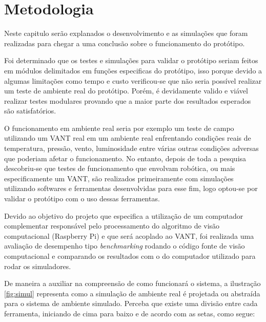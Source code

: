 \chapter{Metodologia}\label{cap:metodologia}

Neste capitulo serão explanados o desenvolvimento e as simulações que foram realizadas para chegar a uma conclusão sobre o funcionamento do protótipo.

Foi determinado que os testes e simulações para validar o protótipo seriam feitos em módulos delimitados em funções especificas do protótipo, isso porque devido a algumas limitações como tempo e custo verificou-se que não seria possível realizar um teste de ambiente real do protótipo. Porém, é devidamente valido e viável realizar testes modulares provando que a maior parte dos resultados esperados são satisfatórios. 

O funcionamento em ambiente real seria por exemplo um teste de campo utilizando um VANT real em um ambiente real enfrentando condições reais de temperatura, pressão, vento, luminosidade entre várias outras condições adversas que poderiam afetar o funcionamento. No entanto, depois de toda a pesquisa descobriu-se que testes de funcionamento que envolvam robótica, ou mais especificamente um VANT, são realizados primeiramente com simulações utilizando softwares e ferramentas desenvolvidas para esse fim, logo optou-se por validar o protótipo com o uso dessas ferramentas. 

Devido ao objetivo do projeto que especifica a utilização de um computador complementar responsável pelo processamento do algoritmo de visão computacional (Raspberry Pi) e que será acoplado ao VANT, foi realizada uma avaliação de desempenho \do tipo \textit{benchmarking} rodando o código fonte de visão computacional e comparando os resultados com o do computador utilizado para rodar os simuladores. 

De maneira a auxiliar na compreensão de como funcionará o sistema, a ilustração \ref{fig:simul} representa como a simulação de ambiente real é projetada ou abstraída para o sistema de ambiente simulado. Perceba que existe uma divisão entre cada ferramenta, iniciando de cima para baixo e de acordo com as setas, como segue:

